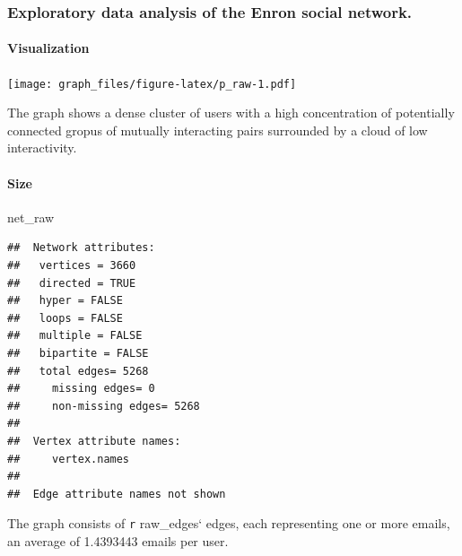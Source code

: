 \documentclass[]{article}
\newenvironment{Shaded}{\begin{snugshade}}{\end{snugshade}}
\newcommand{\KeywordTok}[1]{\textcolor[rgb]{0.13,0.29,0.53}{\textbf{#1}}}
\newcommand{\NormalTok}[1]{#1}
\newcommand{\OperatorTok}[1]{\textcolor[rgb]{0.81,0.36,0.00}{\textbf{#1}}}
\newcommand{\StringTok}[1]{\textcolor[rgb]{0.31,0.60,0.02}{#1}}
\let\oldparagraph\paragraph
\renewcommand{\paragraph}[1]{\oldparagraph{#1}\mbox{}}
\begin{document}
\hypertarget{exploratory-data-analysis-of-the-enron-social-network.}{%
\subsubsection{Exploratory data analysis of the Enron social
network.}\label{exploratory-data-analysis-of-the-enron-social-network.}}

\hypertarget{visualization}{%
\paragraph{Visualization}\label{visualization}}

\texttt{[image: graph\_files/figure-latex/p\_raw-1.pdf]}

The graph shows a dense cluster of users with a high concentration of
potentially connected gropus of mutually interacting pairs surrounded by
a cloud of low interactivity.

\hypertarget{size}{%
\paragraph{Size}\label{size}}

\begin{Shaded}
\begin{Highlighting}[]
\NormalTok{net_raw}
\end{Highlighting}
\end{Shaded}

\begin{verbatim}
##  Network attributes:
##   vertices = 3660 
##   directed = TRUE 
##   hyper = FALSE 
##   loops = FALSE 
##   multiple = FALSE 
##   bipartite = FALSE 
##   total edges= 5268 
##     missing edges= 0 
##     non-missing edges= 5268 
## 
##  Vertex attribute names: 
##     vertex.names 
## 
##  Edge attribute names not shown
\end{verbatim}

\begin{Shaded}
\end{Shaded}

The graph consists of \texttt{r} raw\_edges` edges, each representing
one or more emails, an average of 1.4393443 emails per user.
\end{document}
